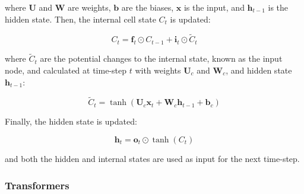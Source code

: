 \documentclass{article}
\begin{document}
where \(\mathbf{U}\) and \(\mathbf{W}\) are weights, \(\mathbf{b}\) are the biases, \(\mathbf{x}\) is the input, and \(\mathbf{h}_{t-1}\) is the hidden state. Then, the internal cell state \(C_t\) is updated:

\[C_t = \mathbf{f}_t \odot C_{t-1} + \mathbf{i}_t \odot \tilde C_t\]

where \(\tilde C_t\) are the potential changes to the internal state, known as the input node, and calculated at time-step \(t\) with weights \(\mathbf{U}_c\) and \(\mathbf{W}_c\), and hidden state \(\mathbf{h}_{t-1}\):

\[\tilde C_t = \tanh(\mathbf{U}_c\mathbf{x}_t + \mathbf{W}_c\mathbf{h}_{t-1}+\mathbf{b}_c)\]

Finally, the hidden state is updated:

\[\mathbf{h}_t = \mathbf{o}_t \odot\tanh(C_t)\]

and both the hidden and internal states are used as input for the next time-step.

\subsubsection{Transformers}\label{Transformers}
\end{document}
